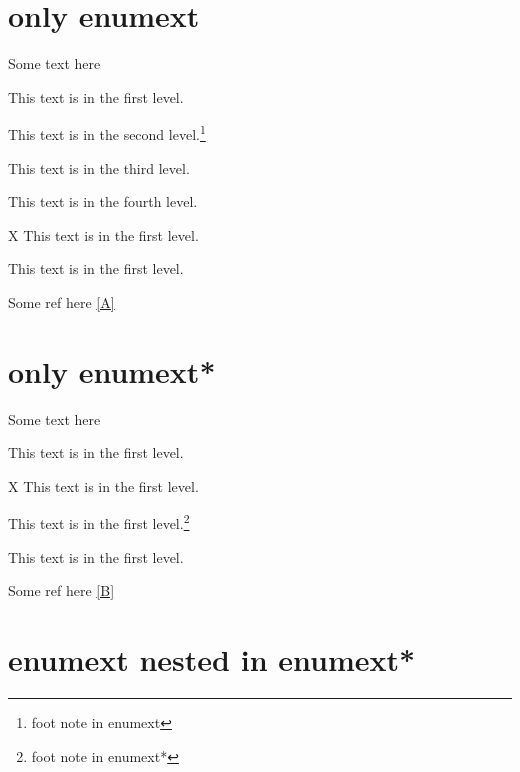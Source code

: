 \documentclass{article}
\begin{document}
\section{only enumext}
Some text here

\begin{enumext}[labelwidth=1cm,labelsep=0.25cm,align=left, wrap-label=\textbf{(#1}, label=\arabic*.)]
  \item This text is in the first level.\label{A}
    \begin{enumext}
      \item This text is in the second level.\footnote{foot note in enumext}
        \begin{enumext}
          \item This text is in the third level.
            \begin{enumext}
              \item This text is in the fourth level.\footnotemark[20]
            \end{enumext}
        \end{enumext}
    \end{enumext}
  \item[X] This text is in the first level.
  \item* This text is in the first level.
\end{enumext}

Some ref here \ref{A}

\section{only enumext*}

Some text here

\begin{enumext*}[columns=2,labelwidth=1cm,labelsep=0.25cm,align=left, wrap-label=\textbf{#1)}, label=(\arabic*.]
  \item This text is in the first level.\label{B}
  \item[X] This text is in the first level.\footnotemark[30]
  \item* This text is in the first level.\footnote{foot note in enumext*}
  \item This text is in the first level.
\end{enumext*}

Some ref here \ref{B}

\section{enumext nested in enumext*}
\end{document}
